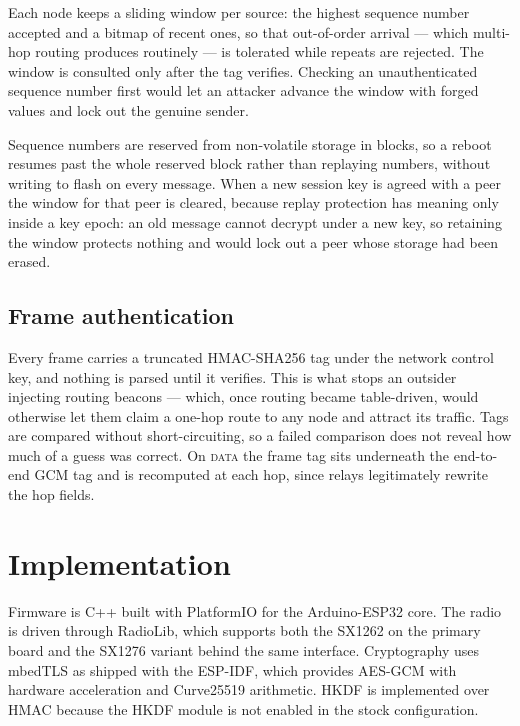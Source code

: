 \documentclass[conference]{IEEEtran}
\begin{document}
Each node keeps a sliding window per source: the highest sequence number accepted
and a bitmap of recent ones, so that out-of-order arrival — which multi-hop
routing produces routinely — is tolerated while repeats are rejected. The window
is consulted only after the tag verifies. Checking an unauthenticated sequence
number first would let an attacker advance the window with forged values and lock
out the genuine sender.

Sequence numbers are reserved from non-volatile storage in blocks, so a reboot
resumes past the whole reserved block rather than replaying numbers, without
writing to flash on every message. When a new session key is agreed with a peer
the window for that peer is cleared, because replay protection has meaning only
inside a key epoch: an old message cannot decrypt under a new key, so retaining
the window protects nothing and would lock out a peer whose storage had been
erased.

\subsection{Frame authentication}

Every frame carries a truncated HMAC-SHA256 tag under the network control key,
and nothing is parsed until it verifies. This is what stops an outsider injecting
routing beacons — which, once routing became table-driven, would otherwise let
them claim a one-hop route to any node and attract its traffic. Tags are compared
without short-circuiting, so a failed comparison does not reveal how much of a
guess was correct. On \textsc{data} the frame tag sits underneath the end-to-end
GCM tag and is recomputed at each hop, since relays legitimately rewrite the hop
fields.

\section{Implementation}\label{sec:impl}

Firmware is C++ built with PlatformIO for the Arduino-ESP32 core. The radio is
driven through RadioLib, which supports both the SX1262 on the primary board and
the SX1276 variant behind the same interface. Cryptography uses mbedTLS as
shipped with the ESP-IDF, which provides AES-GCM with hardware acceleration and
Curve25519 arithmetic. HKDF is implemented over HMAC because the HKDF module is
not enabled in the stock configuration.
\end{document}
